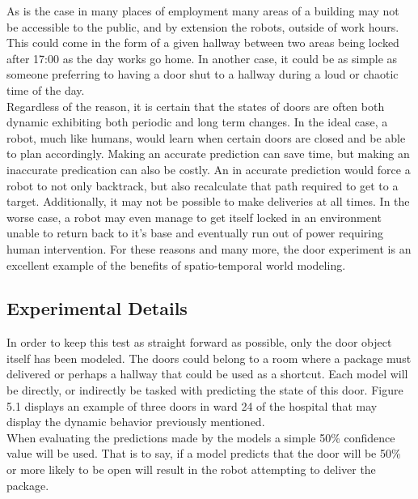   As is the case in many places of employment many areas of a building may not
  be accessible to the public, and by extension the robots, outside of work
  hours.  This could come in the form of a given hallway between two areas being
  locked after 17:00 as the day works go home. In another case, it could be as
  simple as someone preferring to having a door shut to a hallway during a loud
  or chaotic time of the day. \\

  Regardless of the reason, it is certain that the states of doors are often
  both dynamic exhibiting both periodic and long term changes. In the ideal case, a robot, much like humans,
  would learn when certain doors are closed and be able to plan accordingly.
  Making an accurate prediction can save time, but making an inaccurate
  predication can also be costly. An in accurate prediction would force a robot
  to not only backtrack, but also recalculate that path required to get to a
  target. Additionally, it may not be possible to make deliveries at all times.
  In the worse case, a robot may even manage to get itself locked in an
  environment unable to return back to it's base and eventually run out of power
  requiring human intervention. For these reasons and many more, the door
  experiment is an excellent example of the benefits of spatio-temporal world
  modeling. \\

  \subsection{ Experimental Details }

  In order to keep this test as straight forward as possible, only the door
  object itself has been modeled. The doors could belong to a room where a
  package must delivered or perhaps a hallway that could be used as a
  shortcut. Each model will be directly, or indirectly be tasked with
  predicting the state of this door. Figure 5.1 displays an example of three
  doors in ward 24 of the hospital that may display the dynamic behavior
  previously mentioned. \\

  When evaluating the predictions made by the models a simple 50\% confidence
  value will be used. That is to say, if a model predicts that the door will
  be 50\% or more likely to be open will result in the robot attempting to
  deliver the package. \\

